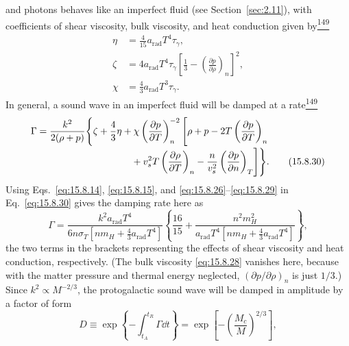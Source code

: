 and photons behaves like an imperfect fluid (see Section~\ref{sec:2.11}),
with coefficients of shear viscosity, bulk viscosity, and heat conduction
given by\hyperref[ch15-ref-149]{\textsuperscript{149}}
\begin{align}
  \eta
  &=
  \frac4{15}a_{\mathrm{rad}}T^4\tau_\gamma,
  \tag{15.8.27}\label{eq:15.8.27}\\
  \zeta
  &=
  4a_{\mathrm{rad}}T^4\tau_\gamma
  \left[
    \frac13-
    \left(\frac{\partial p}{\partial\rho}\right)_n
  \right]^2,
  \tag{15.8.28}\label{eq:15.8.28}\\
  \chi
  &=
  \frac43a_{\mathrm{rad}}T^3\tau_\gamma.
  \tag{15.8.29}\label{eq:15.8.29}
\end{align}
In general, a sound wave in an imperfect fluid will be damped at a
rate\hyperref[ch15-ref-149]{\textsuperscript{149}}
\begin{align}
  \Gamma
  =
  \frac{k^2}{2(\rho+p)}
  \Biggl\{
    \zeta+\frac43\eta
    &+
    \chi
    \left(\frac{\partial p}{\partial T}\right)_n^{-2}
    \Biggl[
      \rho+p
      -2T\left(\frac{\partial p}{\partial T}\right)_n
      \notag\\[-2pt]
      &\quad
      +v_s^2T\left(\frac{\partial\rho}{\partial T}\right)_n
      -\frac{n}{v_s^2}
       \left(\frac{\partial p}{\partial n}\right)_T
    \Biggr]
  \Biggr\}.
  \tag{15.8.30}\label{eq:15.8.30}
\end{align}
Using Eqs.~\eqref{eq:15.8.14}, \eqref{eq:15.8.15}, and
\eqref{eq:15.8.26}--\eqref{eq:15.8.29} in Eq.~\eqref{eq:15.8.30} gives the
damping rate here as
\begin{equation}
  \Gamma
  =
  \frac{
    k^2a_{\mathrm{rad}}T^4
  }{
    6n\sigma_T[nm_H+\tfrac43a_{\mathrm{rad}}T^4]
  }
  \left\{
    \frac{16}{15}
    +
    \frac{
      n^2m_H^2
    }{
      a_{\mathrm{rad}}T^4
      [nm_H+\tfrac43a_{\mathrm{rad}}T^4]
    }
  \right\},
  \tag{15.8.31}\label{eq:15.8.31}
\end{equation}
the two terms in the brackets representing the effects of shear viscosity and
heat conduction, respectively. (The bulk viscosity \eqref{eq:15.8.28}
vanishes here, because with the matter pressure and thermal energy neglected,
\((\partial p/\partial\rho)_n\) is just \(1/3\).) Since
\(k^2\propto M^{-2/3}\), the protogalactic sound wave will be damped in
amplitude by a factor of form
\begin{equation}
  D
  \equiv
  \exp\left\{-\int_{t_A}^{t_R}\Gamma\dd t\right\}
  =
  \exp\left[
    -\left(\frac{M_c}{M}\right)^{2/3}
  \right],
  \tag{15.8.32}\label{eq:15.8.32}
\end{equation}
